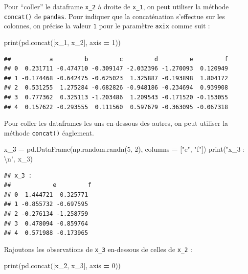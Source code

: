 \documentclass[
  12pt,
]{book}
\newenvironment{Shaded}{\begin{snugshade}}{\end{snugshade}}
\newcommand{\BuiltInTok}[1]{#1}
\newcommand{\CharTok}[1]{\textcolor[rgb]{0.31,0.60,0.02}{#1}}
\newcommand{\DecValTok}[1]{\textcolor[rgb]{0.00,0.00,0.81}{#1}}
\newcommand{\NormalTok}[1]{#1}
\newcommand{\OperatorTok}[1]{\textcolor[rgb]{0.81,0.36,0.00}{\textbf{#1}}}
\newcommand{\StringTok}[1]{\textcolor[rgb]{0.31,0.60,0.02}{#1}}
\numberwithin{equation}{section}
\numberwithin{countremarque}{section}
\begin{document}
Pour ``coller'' le dataframe \texttt{x\_2} à droite de \texttt{x\_1}, on peut utiliser la méthode \texttt{concat()} de \texttt{pandas}. Pour indiquer que la concaténation s'effectue sur les colonnes, on précise la valeur \texttt{1} pour le paramètre \texttt{axix} comme suit :

\begin{Shaded}
\begin{Highlighting}[]
\BuiltInTok{print}\NormalTok{(pd.concat([x\_1, x\_2], axis }\OperatorTok{=} \DecValTok{1}\NormalTok{))}
\end{Highlighting}
\end{Shaded}

\begin{lstlisting}
##           a         b         c         d         e         f
## 0  0.231711 -0.474710 -0.309147 -2.032396 -1.270093  0.120949
## 1 -0.174468 -0.642475 -0.625023  1.325887 -0.193898  1.804172
## 2  0.531255  1.275284 -0.682826 -0.948186 -0.234694  0.939908
## 3  0.777362  0.325113 -1.203486  1.209543 -0.171520 -0.153055
## 4  0.157622 -0.293555  0.111560  0.597679 -0.363095 -0.067318
\end{lstlisting}

Pour coller les dataframes les uns en-dessous des autres, on peut utiliser la méthode \texttt{concat()} éaglement.

\begin{Shaded}
\begin{Highlighting}[]
\NormalTok{x\_3 }\OperatorTok{=}\NormalTok{ pd.DataFrame(np.random.randn(}\DecValTok{5}\NormalTok{, }\DecValTok{2}\NormalTok{),}
\NormalTok{                   columns }\OperatorTok{=}\NormalTok{ [}\StringTok{"e"}\NormalTok{, }\StringTok{"f"}\NormalTok{])}
\BuiltInTok{print}\NormalTok{(}\StringTok{"x\_3 : }\CharTok{\textbackslash{}n}\StringTok{"}\NormalTok{, x\_3)}
\end{Highlighting}
\end{Shaded}

\begin{lstlisting}
## x_3 : 
##            e         f
## 0  1.444721  0.325771
## 1 -0.855732 -0.697595
## 2 -0.276134 -1.258759
## 3  0.478094 -0.859764
## 4  0.571988 -0.173965
\end{lstlisting}

Rajoutons les observations de \texttt{x\_3} en-dessous de celles de \texttt{x\_2} :

\begin{Shaded}
\begin{Highlighting}[]
\BuiltInTok{print}\NormalTok{(pd.concat([x\_2, x\_3], axis }\OperatorTok{=} \DecValTok{0}\NormalTok{))}
\end{Highlighting}
\end{Shaded}
\end{document}
